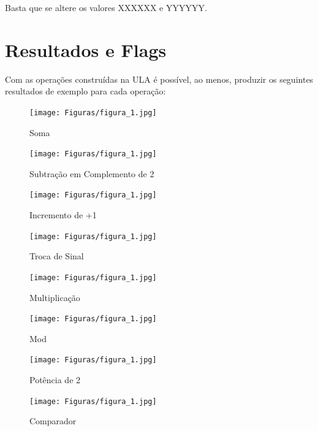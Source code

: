 \documentclass[a4paper, 12pt]{article}
\begin{document}
Basta que se altere os valores XXXXXX e YYYYYY.

\section{Resultados e Flags}

Com as operações construídas na ULA é possível, ao menos, produzir os seguintes resultados de exemplo para cada operação:

\begin{figure}[h]
\caption{Soma}

\centering
\texttt{[image: Figuras/figura\_1.jpg]}
\label{figura:qualquernome}
\end{figure}

\begin{figure}[h]
\caption{Subtração em Complemento de 2}

\centering
\texttt{[image: Figuras/figura\_1.jpg]}
\label{figura:qualquernome}
\end{figure}

\begin{figure}[h]
\caption{Incremento de +1}

\centering
\texttt{[image: Figuras/figura\_1.jpg]}
\label{figura:qualquernome}
\end{figure}

\begin{figure}[h]
\caption{Troca de Sinal}

\centering
\texttt{[image: Figuras/figura\_1.jpg]}
\label{figura:qualquernome}
\end{figure}

\begin{figure}[h]
\caption{Multiplicação}

\centering
\texttt{[image: Figuras/figura\_1.jpg]}
\label{figura:qualquernome}
\end{figure}

\begin{figure}[h]
\caption{Mod}

\centering
\texttt{[image: Figuras/figura\_1.jpg]}
\label{figura:qualquernome}
\end{figure}

\begin{figure}[h]
\caption{Potência de 2}

\centering
\texttt{[image: Figuras/figura\_1.jpg]}
\label{figura:qualquernome}
\end{figure}

\begin{figure}[h]
\caption{Comparador}

\centering
\texttt{[image: Figuras/figura\_1.jpg]}
\label{figura:qualquernome}
\end{figure}
\end{document}
